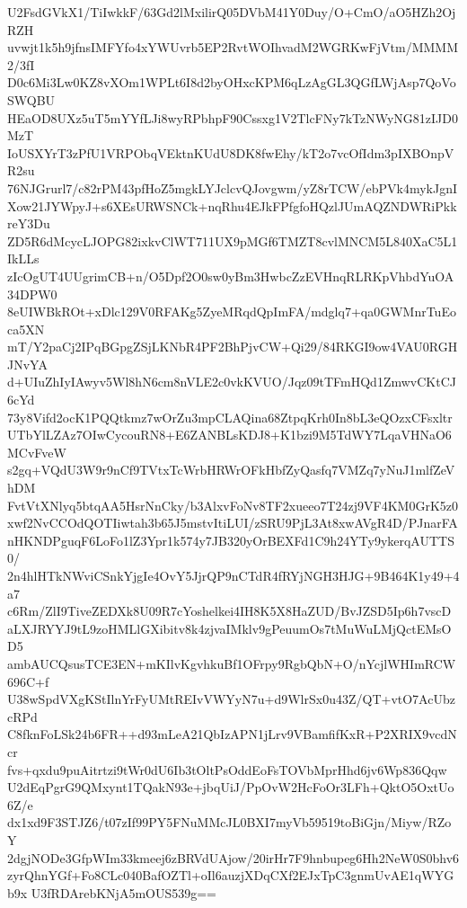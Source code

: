 U2FsdGVkX1/TiIwkkF/63Gd2lMxilirQ05DVbM41Y0Duy/O+CmO/aO5HZh2OjRZH
uvwjt1k5h9jfnsIMFYfo4xYWUvrb5EP2RvtWOIhvadM2WGRKwFjVtm/MMMM2/3fI
D0c6Mi3Lw0KZ8vXOm1WPLt6I8d2byOHxcKPM6qLzAgGL3QGfLWjAsp7QoVoSWQBU
HEaOD8UXz5uT5mYYfLJi8wyRPbhpF90Cssxg1V2TlcFNy7kTzNWyNG81zIJD0MzT
IoUSXYrT3zPfU1VRPObqVEktnKUdU8DK8fwEhy/kT2o7vcOfIdm3pIXBOnpVR2su
76NJGrurl7/c82rPM43pfHoZ5mgkLYJclcvQJovgwm/yZ8rTCW/ebPVk4mykJgnI
Xow21JYWpyJ+s6XEsURWSNCk+nqRhu4EJkFPfgfoHQzlJUmAQZNDWRiPkkreY3Du
ZD5R6dMcycLJOPG82ixkvClWT711UX9pMGf6TMZT8cvlMNCM5L840XaC5L1IkLLs
zIcOgUT4UUgrimCB+n/O5Dpf2O0sw0yBm3HwbcZzEVHnqRLRKpVhbdYuOA34DPW0
8eUIWBkROt+xDlc129V0RFAKg5ZyeMRqdQpImFA/mdglq7+qa0GWMnrTuEoca5XN
mT/Y2paCj2IPqBGpgZSjLKNbR4PF2BhPjvCW+Qi29/84RKGI9ow4VAU0RGHJNvYA
d+UIuZhIyIAwyv5Wl8hN6cm8nVLE2c0vkKVUO/Jqz09tTFmHQd1ZmwvCKtCJ6cYd
73y8Vifd2ocK1PQQtkmz7wOrZu3mpCLAQina68ZtpqKrh0In8bL3eQOzxCFsxltr
UTbYlLZAz7OIwCycouRN8+E6ZANBLsKDJ8+K1bzi9M5TdWY7LqaVHNaO6MCvFveW
s2gq+VQdU3W9r9nCf9TVtxTcWrbHRWrOFkHbfZyQasfq7VMZq7yNuJ1mlfZeVhDM
FvtVtXNlyq5btqAA5HsrNnCky/b3AlxvFoNv8TF2xueeo7T24zj9VF4KM0GrK5z0
xwf2NvCCOdQOTIiwtah3b65J5mstvItiLUI/zSRU9PjL3At8xwAVgR4D/PJnarFA
nHKNDPguqF6LoFo1lZ3Ypr1k574y7JB320yOrBEXFd1C9h24YTy9ykerqAUTTS0/
2n4hlHTkNWviCSnkYjgIe4OvY5JjrQP9nCTdR4fRYjNGH3HJG+9B464K1y49+4a7
c6Rm/ZlI9TiveZEDXk8U09R7cYoshelkei4IH8K5X8HaZUD/BvJZSD5Ip6h7vscD
aLXJRYYJ9tL9zoHMLlGXibitv8k4zjvaIMklv9gPeuumOs7tMuWuLMjQctEMsOD5
ambAUCQsusTCE3EN+mKIlvKgvhkuBf1OFrpy9RgbQbN+O/nYcjlWHImRCW696C+f
U38wSpdVXgKStIlnYrFyUMtREIvVWYyN7u+d9WlrSx0u43Z/QT+vtO7AcUbzcRPd
C8fknFoLSk24b6FR++d93mLeA21QbIzAPN1jLrv9VBamfifKxR+P2XRIX9vcdNcr
fvs+qxdu9puAitrtzi9tWr0dU6Ib3tOltPsOddEoFsTOVbMprHhd6jv6Wp836Qqw
U2dEqPgrG9QMxynt1TQakN93e+jbqUiJ/PpOvW2HcFoOr3LFh+QktO5OxtUo6Z/e
dx1xd9F3STJZ6/t07zIf99PY5FNuMMcJL0BXI7myVb59519toBiGjn/Miyw/RZoY
2dgjNODe3GfpWIm33kmeej6zBRVdUAjow/20irHr7F9hnbupeg6Hh2NeW0S0bhv6
zyrQhnYGf+Fo8CLc040BafOZTl+oIl6auzjXDqCXf2EJxTpC3gnmUvAE1qWYGb9x
U3fRDArebKNjA5mOUS539g==
